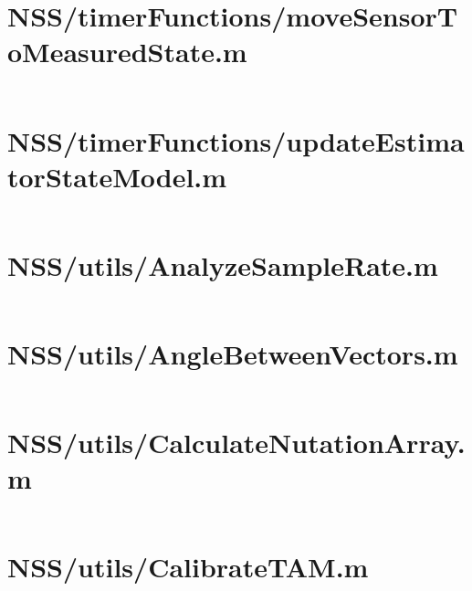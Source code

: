 \pagebreak
\section*{NSS/timerFunctions/moveSensorToMeasuredState.m}\label{code:NSS/timerFunctions/moveSensorToMeasuredState.m}
\inputminted[linenos,fontsize=\scriptsize]{matlab}{/home/dcouture/git/mathyourlife/TSatPy/beta_versions/matlab_object_oriented/timerFunctions/moveSensorToMeasuredState.m}

\pagebreak
\section*{NSS/timerFunctions/updateEstimatorStateModel.m}\label{code:NSS/timerFunctions/updateEstimatorStateModel.m}
\inputminted[linenos,fontsize=\scriptsize]{matlab}{/home/dcouture/git/mathyourlife/TSatPy/beta_versions/matlab_object_oriented/timerFunctions/updateEstimatorStateModel.m}

\pagebreak
\section*{NSS/utils/AnalyzeSampleRate.m}\label{code:NSS/utils/AnalyzeSampleRate.m}
\inputminted[linenos,fontsize=\scriptsize]{matlab}{/home/dcouture/git/mathyourlife/TSatPy/beta_versions/matlab_object_oriented/utils/AnalyzeSampleRate.m}

\pagebreak
\section*{NSS/utils/AngleBetweenVectors.m}\label{code:NSS/utils/AngleBetweenVectors.m}
\inputminted[linenos,fontsize=\scriptsize]{matlab}{/home/dcouture/git/mathyourlife/TSatPy/beta_versions/matlab_object_oriented/utils/AngleBetweenVectors.m}

\pagebreak
\section*{NSS/utils/CalculateNutationArray.m}\label{code:NSS/utils/CalculateNutationArray.m}
\inputminted[linenos,fontsize=\scriptsize]{matlab}{/home/dcouture/git/mathyourlife/TSatPy/beta_versions/matlab_object_oriented/utils/CalculateNutationArray.m}

\pagebreak
\section*{NSS/utils/CalibrateTAM.m}\label{code:NSS/utils/CalibrateTAM.m}
\inputminted[linenos,fontsize=\scriptsize]{matlab}{/home/dcouture/git/mathyourlife/TSatPy/beta_versions/matlab_object_oriented/utils/CalibrateTAM.m}

